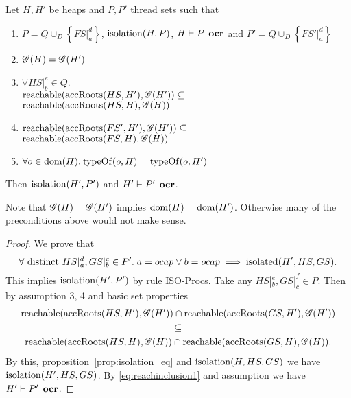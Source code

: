 \begin{proposition} \label{prop:common_isolation_orc_gen}
  Let $H, H'$ be heaps and $P, P'$ thread sets such that
  \begin{enumerate}
    \item $P = Q \cup_D \left\{ FS|_a^d \right\}$, $\mbox{$\mathrm{isolation}$}{(H, P)}$, $H
      \vdash P \:\: \mbox{\bf ocr}$ and $P' = Q \cup_D \left\{ FS'|_a^d \right\}$
    \item $\mathscr{G}{(H)} = \mathscr{G}{(H')}$
    \item $\forall HS|_b^e \in Q.$ \\ 
      $\mbox{$\mathrm{reachable}$}{(\mbox{$\mathrm{accRoots}$}{(HS, H')}, \ensuremath{\mathscr{G}}{(H')})} \subseteq$ \\
      $\mbox{$\mathrm{reachable}$}{(\mbox{$\mathrm{accRoots}$}{(HS, H)}, \ensuremath{\mathscr{G}}{(H)})}$
    \item $\mbox{$\mathrm{reachable}$}{(\mbox{$\mathrm{accRoots}$}{(FS', H')}, \ensuremath{\mathscr{G}}{(H')})} \subseteq$ \\
      $\mbox{$\mathrm{reachable}$}{(\mbox{$\mathrm{accRoots}$}{(FS, H)}, \ensuremath{\mathscr{G}}{(H)})}$
    \item $\forall o \in \mbox{$\mathrm{dom}$}{(H)}. \: \mbox{$\mathrm{typeOf}$}{(o, H)} = \mbox{$\mathrm{typeOf}$}{(o, H')}$
  \end{enumerate}
  Then $\mbox{$\mathrm{isolation}$}{(H', P')}$ and $H' \vdash P' \:\: \mbox{\bf ocr}$.
\end{proposition}

\begin{remark}
  Note that $\mathscr{G}{(H)} = \mathscr{G}{(H')}$ implies $\mbox{$\mathrm{dom}$}{(H)} = \mbox{$\mathrm{dom}$}{(H')}$.
  Otherwise many of the preconditions above would not make sense.
\end{remark}

\begin{proof}
  We prove that 
  \begin{equation*}
    \forall \text{ distinct } HS|_a^d, GS|_b^e \in P'.\; a = \mbox{$ocap$} \lor b = \mbox{$ocap$} \implies
    \mbox{$\mathrm{isolated}$}(H', HS, GS).
  \end{equation*}
  This implies $\mbox{$\mathrm{isolation}$}(H', P')$ by rule {\sc ISO-Procs}.
  Take any $HS|_b^e, GS|_c^f \in P$. Then by assumption 3, 4 and basic set
  properties
  \begin{equation} \label{eq:reachinclusion1}
    \begin{gathered}
      \mbox{$\mathrm{reachable}$}(\mbox{$\mathrm{accRoots}$}(HS, H'), \mathscr{G}(H')) \cap \mbox{$\mathrm{reachable}$}(\mbox{$\mathrm{accRoots}$}(GS, H'),
      \mathscr{G}(H')) \\
      \subseteq \\
      \mbox{$\mathrm{reachable}$}(\mbox{$\mathrm{accRoots}$}(HS, H), \mathscr{G}(H)) \cap \mbox{$\mathrm{reachable}$}(\mbox{$\mathrm{accRoots}$}(GS, H),
      \mathscr{G}(H)).
    \end{gathered}
  \end{equation}
  By this, proposition~\ref{prop:isolation_eq} and $\mbox{$\mathrm{isolation}$}(H, HS, GS)$ we have
  $\mbox{$\mathrm{isolation}$}(H', HS, GS)$. By \eqref{eq:reachinclusion1} and assumption
  we have $H' \vdash P' \:\: \mbox{\bf ocr}$.
\end{proof}

